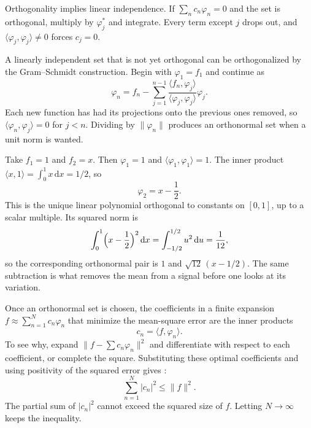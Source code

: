 Orthogonality implies linear independence. If $\sum_n c_n\varphi_n=0$ and the set is orthogonal, multiply by $\varphi_j^*$ and integrate. Every term except $j$ drops out, and $\langle\varphi_j,\varphi_j\rangle\neq 0$ forces $c_j=0$.

A linearly independent set that is not yet orthogonal can be orthogonalized by the Gram--Schmidt construction. Begin with $\varphi_1=f_1$ and continue as
\begin{equation}
\varphi_n=f_n-\sum_{j=1}^{n-1}
\frac{\langle f_n,\varphi_j\rangle}{\langle\varphi_j,\varphi_j\rangle}\varphi_j.
\label{eq:ch05-gram-schmidt}
\end{equation}
Each new function has had its projections onto the previous ones removed, so $\langle\varphi_n,\varphi_j\rangle=0$ for $j<n$. Dividing by $\lVert\varphi_n\rVert$ produces an orthonormal set when a unit norm is wanted.

\begin{example}[{Orthogonalizing $\{1,x\}$ on $[0,1]$}]
Take $f_1=1$ and $f_2=x$. Then $\varphi_1=1$ and $\langle\varphi_1,\varphi_1\rangle=1$. The inner product $\langle x,1\rangle=\int_0^1 x\,\mathrm{d}x=1/2$, so
\begin{equation}
\varphi_2=x-\frac12.
\end{equation}
This is the unique linear polynomial orthogonal to constants on $[0,1]$, up to a scalar multiple. Its squared norm is
\begin{equation}
\int_0^1\Bigl(x-\frac12\Bigr)^2\,\mathrm{d}x=\int_{-1/2}^{1/2}u^2\,\mathrm{d}u=\frac{1}{12},
\end{equation}
so the corresponding orthonormal pair is $1$ and $\sqrt{12}\,(x-1/2)$. The same subtraction is what removes the mean from a signal before one looks at its variation.
\end{example}

Once an orthonormal set is chosen, the coefficients in a finite expansion $f\approx\sum_{n=1}^N c_n\varphi_n$ that minimize the mean-square error are the inner products
\begin{equation}
c_n=\langle f,\varphi_n\rangle.
\label{eq:ch05-coeff}
\end{equation}
To see why, expand $\lVert f-\sum c_n\varphi_n\rVert^2$ and differentiate with respect to each coefficient, or complete the square. Substituting these optimal coefficients and using positivity of the squared error gives :
\begin{equation}
\sum_{n=1}^{N}|c_n|^2\leq\lVert f\rVert^2.
\label{eq:ch05-bessel}
\end{equation}
The partial sum of $|c_n|^2$ cannot exceed the squared size of $f$. Letting $N\to\infty$ keeps the inequality.

